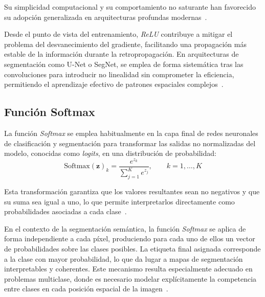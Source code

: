 Su simplicidad computacional y su comportamiento no saturante han favorecido su adopción generalizada en arquitecturas profundas modernas~\cite{ji2022automation}.

Desde el punto de vista del entrenamiento, \textit{ReLU} contribuye a mitigar el problema del desvanecimiento del gradiente, facilitando una propagación más estable de la información durante la retropropagación. En arquitecturas de segmentación como U-Net o SegNet, se emplea de forma sistemática tras las convoluciones para introducir no linealidad sin comprometer la eficiencia, permitiendo el aprendizaje efectivo de patrones espaciales complejos~\cite{liu2022convnext, nair2010relu}.

\subsection{Función Softmax}
La función \textit{Softmax} se emplea habitualmente en la capa final de redes neuronales de clasificación y segmentación para transformar las salidas no normalizadas del modelo, conocidas como \textit{logits}, en una distribución de probabilidad: \begin{equation}
	\mathrm{Softmax}(\mathbf{z})_k = \frac{e^{z_k}}{\sum_{j=1}^{K} e^{z_j}}, \qquad k=1,\dots,K
\end{equation}

Esta transformación garantiza que los valores resultantes sean no negativos y que su suma sea igual a uno, lo que permite interpretarlos directamente como probabilidades asociadas a cada clase~\cite{Goodfellow-et-al-2016}.

En el contexto de la segmentación semántica, la función \textit{Softmax} se aplica de forma independiente a cada píxel, produciendo para cada uno de ellos un vector de probabilidades sobre las clases posibles. La etiqueta final asignada corresponde a la clase con mayor probabilidad, lo que da lugar a mapas de segmentación interpretables y coherentes. Este mecanismo resulta especialmente adecuado en problemas multiclase, donde es necesario modelar explícitamente la competencia entre clases en cada posición espacial de la imagen~\cite{ronneberger2015unet, badrinarayanan2016segnet}.

